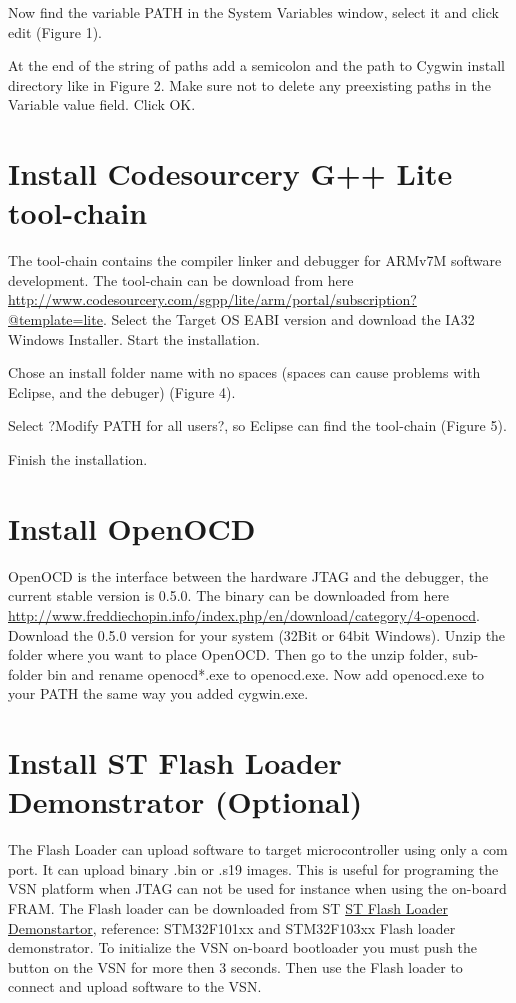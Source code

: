 \documentclass[12pt,a4paper]{article}
\begin{document}
Now find the variable PATH in the System Variables window, select it and click edit (Figure 1).

At the end of the string of paths add a semicolon and the path to Cygwin install directory like in Figure 2. Make sure not to delete any preexisting paths in the Variable value field. Click OK.

\section{Install Codesourcery G++ Lite tool-chain}
The tool-chain contains the compiler linker and debugger for ARMv7M software development. The tool-chain can be download from here \href{http://www.codesourcery.com/sgpp/lite/arm/portal/subscription?@template=lite}{http://www.codesourcery.com/sgpp/lite/arm/portal/subscription?@template=lite}. Select the Target OS EABI version and download the IA32 Windows Installer.
Start the installation.

Chose an install folder name with no spaces (spaces can cause problems with Eclipse, and the debuger) (Figure 4).

Select ?Modify PATH for all users?, so Eclipse can find the tool-chain (Figure 5).

Finish the installation.

\section{Install OpenOCD}
OpenOCD is the interface between the hardware JTAG and the debugger, the current stable version is 0.5.0. The binary can be downloaded from here \href{http://www.freddiechopin.info/index.php/en/download/category/4-openocd}{http://www.freddiechopin.info/index.php/en/download/category/4-openocd}. Download the 0.5.0 version for your system (32Bit or 64bit Windows). Unzip the folder where you want to place OpenOCD. Then go to the unzip folder, sub-folder bin and rename openocd*.exe to openocd.exe. Now add openocd.exe to your PATH the same way you added cygwin.exe.

\section{Install ST Flash Loader Demonstrator (Optional)}
The Flash Loader can upload software to target microcontroller using only a com port. It can upload binary .bin or .s19 images. This is useful for programing the VSN platform when JTAG can not be used for instance when using the on-board FRAM. The Flash loader can be downloaded from ST \href{http://www.st.com/stonline/stappl/resourceSelector/app?page=resourceSelector&doctype=SW_DEMO&ClassID=1734}{ST Flash Loader Demonstartor}, reference: STM32F101xx and STM32F103xx Flash loader demonstrator. To initialize the VSN on-board bootloader you must push the button on the VSN for more then 3 seconds. Then use the Flash loader to connect and upload software to the VSN.
\end{document}

